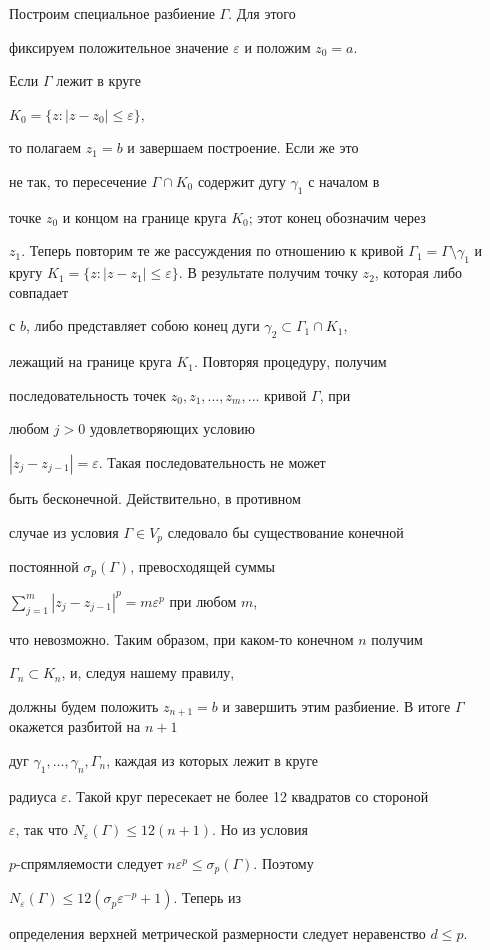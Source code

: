 \begin{pf}


Построим специальное разбиение $\Gamma$. Для этого


фиксируем положительное значение $\varepsilon$ и положим $z_0 = a$.


Если $\Gamma$ лежит в круге


$K_0 = \{z: |z-z_0|\le\varepsilon\},$


то полагаем $z_1 =b$ и завершаем построение. Если же это


не так, то пересечение $\Gamma\cap K_0$ содержит дугу $\gamma_1$ с началом в


точке $z_0$ и концом на границе круга $K_0$; этот конец обозначим через


$z_1$. Теперь повторим те же рассуждения по отношению к кривой $\Gamma_1 =


\Gamma\setminus\gamma_1$ и кругу $K_1 = \{z: |z-z_1|\le


\varepsilon\}.$ В результате получим точку $z_2$, которая либо совпадает


с $b$, либо представляет собою конец дуги $\gamma_2\subset\Gamma_1\cap K_1$,


лежащий на границе круга $K_1$. Повторяя процедуру, получим


последовательность точек $z_0, z_1,\dotsc,z_m,\dotsc$ кривой $\Gamma$, при


любом $j>0$ удовлетворяющих условию


$| z_j -z_{j-1}| =\varepsilon.$ Такая последовательность не может


быть бесконечной. Действительно, в противном


случае из условия $\Gamma\in V_p$ следовало бы существование конечной


постоянной $\sigma_p(\Gamma)$, превосходящей суммы


$\sum\limits_{j=1}^{m}| z_j -z_{j-1}|^p = m\varepsilon^p$ при любом $m$,


что невозможно. Таким образом, при каком-то конечном $n$ получим


$\Gamma_n\subset K_n$, и, следуя нашему правилу,


должны будем положить $z_{n+1}


= b$ и завершить этим разбиение. В итоге $\Gamma$ окажется разбитой на $n+1$


дуг $\gamma_1,\dotsc,\gamma_n,\Gamma_n$, каждая из которых лежит в круге


радиуса $\varepsilon$. Такой круг пересекает не более 12 квадратов со стороной


$\varepsilon$, так что $N_{\varepsilon}(\Gamma)\le 12(n+1).$ Но из условия


$p$-спрямляемости следует $n\varepsilon^p\le\sigma_{p}(\Gamma).$ Поэтому


$N_{\varepsilon}(\Gamma)\le 12(\sigma_{p}\varepsilon^{-p} +1).$ Теперь из


определения верхней метрической размерности следует неравенство $d\le p.$


\end{pf}





